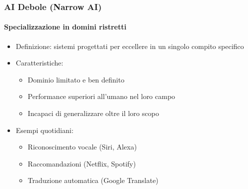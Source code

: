 %
\begin{frame}[t,fragile] \frametitle{AI Debole (Narrow AI)}
	{\scriptsize
		\onslide<1->
            \framesubtitle{Specializzazione in domini ristretti}
            \vspace*{-10pt}
	    	\begin{minipage}[t]{\textwidth}
				\begin{minipage}[t]{0.6\textwidth}
	    			\begin{itemize}[leftmargin=10pt,align=right]
						\onslide<2->\item[\alert{\faHandORight}] \alert{Definizione:} sistemi progettati per eccellere in \alert{un singolo compito specifico}
						\onslide<3->\item[\alert{\faHandORight}] \alert{Caratteristiche:}
						\begin{itemize}[leftmargin=10pt,align=right]
							\item[\alert{\faHandORight}] Dominio limitato e ben definito
							\item[\alert{\faHandORight}] Performance superiori all'umano nel loro campo
							\item[\alert{\faHandORight}] Incapaci di generalizzare oltre il loro scopo
						\end{itemize}
						\item[\alert{\faHandORight}] \alert{Esempi quotidiani:}
						\begin{itemize}[leftmargin=10pt,align=right]
							\item[\alert{\faHandORight}] Riconoscimento vocale (Siri, Alexa)
							\item[\alert{\faHandORight}] Raccomandazioni (Netflix, Spotify)
							\item[\alert{\faHandORight}] Traduzione automatica (Google Translate)
						\end{itemize}
					\end{itemize}
            	\end{minipage}
            	\begin{minipage}[t]{0.4\textwidth}
                	\centering
            	\end{minipage}
	    	\end{minipage}
	}
\end{frame}
